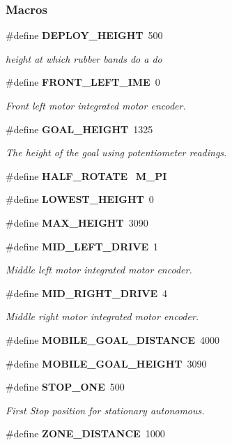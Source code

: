 \subsubsection*{Macros}
\begin{DoxyCompactItemize}
\item 
\#define \textbf{ D\+E\+P\+L\+O\+Y\+\_\+\+H\+E\+I\+G\+HT}~500
\begin{DoxyCompactList}\small\item\em height at which rubber bands do a do \end{DoxyCompactList}\item 
\#define \textbf{ F\+R\+O\+N\+T\+\_\+\+L\+E\+F\+T\+\_\+\+I\+ME}~0
\begin{DoxyCompactList}\small\item\em Front left motor integrated motor encoder. \end{DoxyCompactList}\item 
\#define \textbf{ G\+O\+A\+L\+\_\+\+H\+E\+I\+G\+HT}~1325
\begin{DoxyCompactList}\small\item\em The height of the goal using potentiometer readings. \end{DoxyCompactList}\item 
\#define \textbf{ H\+A\+L\+F\+\_\+\+R\+O\+T\+A\+TE}~\textbf{ M\+\_\+\+PI}
\item 
\#define \textbf{ L\+O\+W\+E\+S\+T\+\_\+\+H\+E\+I\+G\+HT}~0
\item 
\#define \textbf{ M\+A\+X\+\_\+\+H\+E\+I\+G\+HT}~3090
\item 
\#define \textbf{ M\+I\+D\+\_\+\+L\+E\+F\+T\+\_\+\+D\+R\+I\+VE}~1
\begin{DoxyCompactList}\small\item\em Middle left motor integrated motor encoder. \end{DoxyCompactList}\item 
\#define \textbf{ M\+I\+D\+\_\+\+R\+I\+G\+H\+T\+\_\+\+D\+R\+I\+VE}~4
\begin{DoxyCompactList}\small\item\em Middle right motor integrated motor encoder. \end{DoxyCompactList}\item 
\#define \textbf{ M\+O\+B\+I\+L\+E\+\_\+\+G\+O\+A\+L\+\_\+\+D\+I\+S\+T\+A\+N\+CE}~4000
\item 
\#define \textbf{ M\+O\+B\+I\+L\+E\+\_\+\+G\+O\+A\+L\+\_\+\+H\+E\+I\+G\+HT}~3090
\item 
\#define \textbf{ S\+T\+O\+P\+\_\+\+O\+NE}~500
\begin{DoxyCompactList}\small\item\em First Stop position for stationary autonomous. \end{DoxyCompactList}\item 
\#define \textbf{ Z\+O\+N\+E\+\_\+\+D\+I\+S\+T\+A\+N\+CE}~1000
\end{DoxyCompactItemize}


